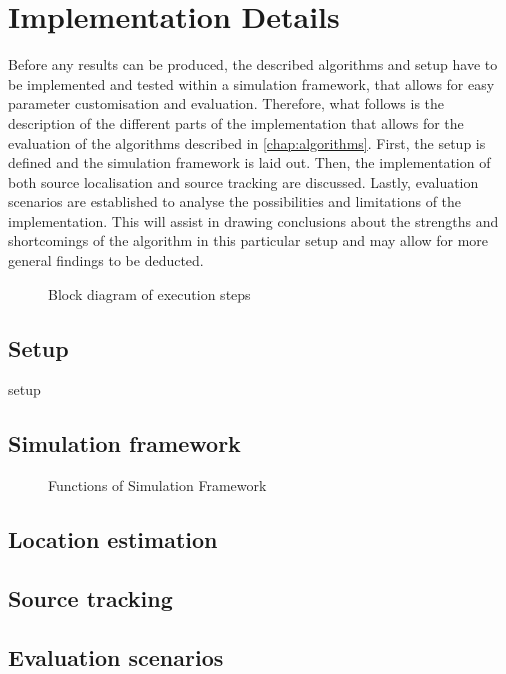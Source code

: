 \chapter{Implementation Details}
\label{chap:implementation}
Before any results can be produced, the described algorithms and setup have to be implemented and tested within a simulation framework, that allows for easy parameter customisation and evaluation. Therefore, what follows is the description of the different parts of the implementation that allows for the evaluation of the algorithms described in \ref{chap:algorithms}. First, the setup is defined and the simulation framework is laid out. Then, the implementation of both source localisation and source tracking are discussed. Lastly, evaluation scenarios are established to analyse the possibilities and limitations of the implementation. This will assist in drawing conclusions about the strengths and shortcomings of the algorithm in this particular setup and may allow for more general findings to be deducted.

\begin{figure}[H]
	\centering
	
	\caption{Block diagram of execution steps}
	\label{diag:execBlocks}
\end{figure}




\section{Setup}
\label{sec:setup}
{setup}

\section{Simulation framework}
\begin{figure}[H]
	\centering
	
	\caption{Functions of Simulation Framework}
	\label{diag:simulationFramework}
\end{figure}

%

\section{Location estimation}
\section{Source tracking}
\section{Evaluation scenarios}